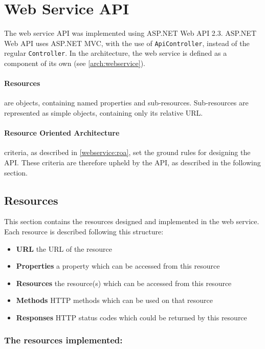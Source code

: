 \section{Web Service API}\label{design:web_service}
The web service API was implemented using ASP.NET Web API 2.3\cite{aspnet_webapi}.
ASP.NET Web API uses ASP.NET MVC\cite{aspnet_mvc}, with the use of \texttt{ApiController}, instead of the regular \texttt{Controller}.
In the architecture, the web service is defined as a component of its own (see \cref{arch:webservice}).

\paragraph{Resources} are objects, containing named properties and sub-resources.
Sub-resources are represented as simple objects, containing only its relative URL.



\paragraph{Resource Oriented Architecture} criteria, as described in \cref{webservice:roa}, set the ground rules for designing the API.
These criteria are therefore upheld by the API, as described in the following section.

\subsection{Resources}\label{webservice:resources}
This section contains the resources designed and implemented in the web service.
Each resource is described following this structure:
\begin{itemize}
\item \textbf{URL} the URL of the resource
\item \textbf{Properties} a property which can be accessed from this resource
\item \textbf{Resources} the resource(s) which can be accessed from this resource
\item \textbf{Methods} HTTP methods which can be used on that resource
\item \textbf{Responses} HTTP status codes which could be returned by this resource
\end{itemize}

\subsubsection{The resources implemented:}

